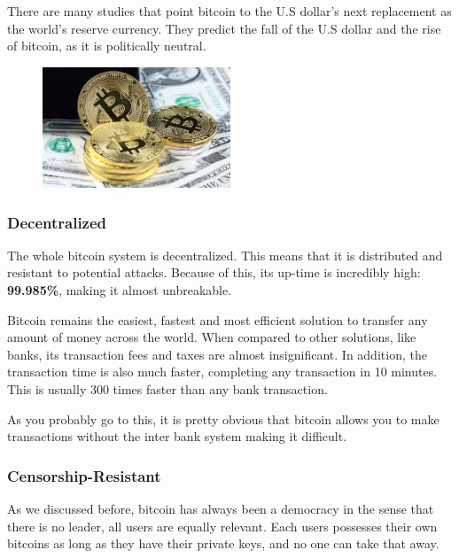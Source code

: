 \documentclass{article}
\newcommand\tab[1][1cm]{\hspace*{#1}}
\begin{document}
There are many studies that point bitcoin to the U.S dollar's next replacement as the world's reserve currency. They predict the fall of the U.S dollar and the rise of bitcoin, as it is politically neutral. 

\begin{figure}[H]
    \begin{center}
        \includegraphics[width=0.5\textwidth]{images/dollar_bitcoin.jpeg}
    \end{center}
\end{figure}

\subsubsection{Decentralized}

\tab The whole bitcoin system is decentralized. This means that it is distributed and resistant to potential attacks. Because of this, its up-time is incredibly high: \textbf{99.985\%}, making it almost unbreakable. 

Bitcoin remains the easiest, fastest and most efficient solution to transfer any amount of money across the world. When compared to other solutions, like banks, its transaction fees and taxes are almost insignificant. In addition, the transaction time is also much faster, completing any transaction in 10 minutes. This is usually 300 times faster than any bank transaction. 

As you probably go to this, it is pretty obvious that bitcoin allows you to make transactions without the inter bank system making it difficult.

\subsubsection{Censorship-Resistant}

\tab As we discussed before, bitcoin has always been a democracy in the sense that there is no leader, all users are equally relevant. Each users possesses their own bitcoins as long as they have their private keys, and no one can take that away. 
\end{document}
